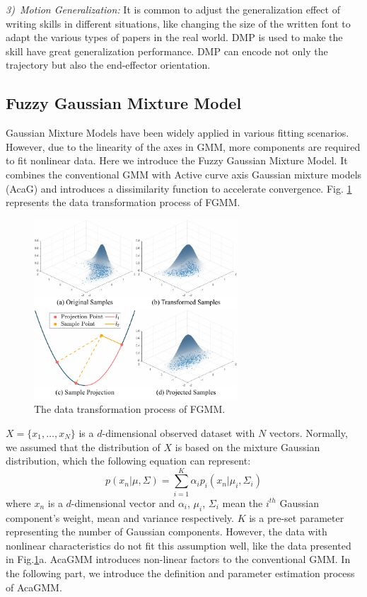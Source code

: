 \documentclass[journal]{IEEEtran}
\begin{document}
\emph{3)~Motion Generalization:} It is common to adjust the generalization effect of writing skills in different situations, like changing the size of the written font to adapt the various types of papers in the real world. DMP is used to make the skill have great generalization performance. DMP can encode not only the trajectory but also the end-effector orientation.

\subsection{Fuzzy Gaussian Mixture Model}
Gaussian Mixture Models have been widely applied in various fitting scenarios. However, due to the linearity of the axes in GMM, more components are required to fit nonlinear data. Here we introduce the Fuzzy Gaussian Mixture Model. It combines the conventional GMM with Active curve axis Gaussian mixture models (AcaG) and introduces a dissimilarity function to accelerate convergence. Fig. \ref{fig2} represents the data transformation process of FGMM.
\begin{figure}[!t]
    \centering
    \includegraphics[width=3in]{./fig/fig2.pdf}
    \caption{The data transformation process of FGMM.}
    \label{fig2}
\end{figure}

$X=\{x_1,\hdots,x_N\}$ is a $d$-dimensional observed dataset with $N$ vectors. Normally, we assumed that the distribution of $X$ is based on the mixture Gaussian distribution, which the following equation can represent:
\begin{equation}
    p(x_n|\mu,\Sigma)=\sum\limits^K_{i=1}\alpha_i p_i(x_n|\mu_i,\Sigma_i)
\end{equation}  
where $x_n$ is a $d$-dimensional vector and $\alpha_i$, $\mu_i$, $\Sigma_i$ mean the $i^{th}$ Gaussian component's weight, mean and variance respectively. $K$ is a pre-set parameter representing the number of Gaussian components. However, the data with nonlinear characteristics do not fit this assumption well, like the data presented in Fig.\ref{fig2}a. AcaGMM introduces non-linear factors to the conventional GMM. In the following part, we introduce the definition and parameter estimation process of AcaGMM.
\end{document}
